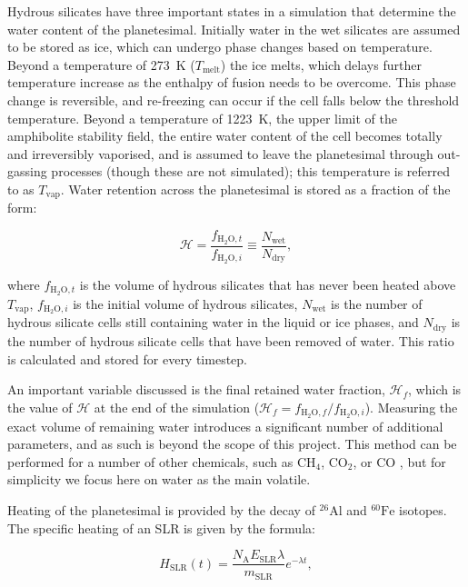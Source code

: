 \documentclass[fleqn,usenatbib]{mnras}
\newcommand{\rms}[1]{\ensuremath{_{\text{#1}}}}
\newcommand{\atom}[2]{$^{#2}\text{#1}$}
\newcommand{\al}{\atom{Al}{26}}
\newcommand{\fe}{\atom{Fe}{60}}
\newcommand{\waterfraci}{f_{\text{H}_2\text{O},i}}
\newcommand{\waterfract}{f_{\text{H}_2\text{O},t}}
\newcommand{\waterfracf}{f_{\text{H}_2\text{O},f}}
\newcommand{\waterfracH}{\mathcal{H}}
\newcommand{\waterfracHf}{\mathcal{H}_f}
\begin{document}
Hydrous silicates have three important states in a simulation that determine the water content of the planetesimal.
Initially water in the wet silicates are assumed to be stored as ice, which can undergo phase changes based on temperature.
Beyond a temperature of \SI{273}{K} ($T\rms{melt}$) the ice melts, which delays further temperature increase as the enthalpy of fusion needs to be overcome.
This phase change is reversible, and re-freezing can occur if the cell falls below the threshold temperature.
Beyond a temperature of \SI{1223}{K}, the upper limit of the amphibolite stability field, the entire water content of the cell becomes totally and irreversibly vaporised, and is assumed to leave the planetesimal through out-gassing processes (though these are not simulated); this temperature is referred to as $T\rms{vap}$.
Water retention across the planetesimal is stored as a fraction of the form:

\begin{equation}
  \waterfracH = \frac{\waterfract}{\waterfraci}\equiv \frac{N\rms{wet}}{N\rms{dry}} , 
\end{equation}

\noindent
where $\waterfract$ is the volume of hydrous silicates that has never been heated above $T\rms{vap}$, $\waterfraci$ is the initial volume of hydrous silicates, $N\rms{wet}$ is the number of hydrous silicate cells still containing water in the liquid or ice phases, and $N\rms{dry}$ is the number of hydrous silicate cells that have been removed of water.
This ratio is calculated and stored for every timestep.

An important variable discussed is the final retained water fraction, $\waterfracHf$, which is the value of $\waterfracH$ at the end of the simulation ($\waterfracHf = \waterfracf / \waterfraci$).
Measuring the exact volume of remaining water introduces a significant number of additional parameters, and as such is beyond the scope of this project.
This method can be performed for a number of other chemicals, such as CH$_4$, CO$_2$, or CO \citep{2021ApJ...913L..20L}, but for simplicity we focus here on water as the main volatile.

Heating of the planetesimal is provided by the decay of \al{} and \fe{} isotopes.
The specific heating of an SLR is given by the formula:

\begin{equation}
  \label{eq:specificheating}
  H\rms{SLR}(t) = \frac{N\rms{A} E\rms{SLR} \lambda}{m\rms{SLR}} e^{-\lambda t},
\end{equation}
\end{document}
